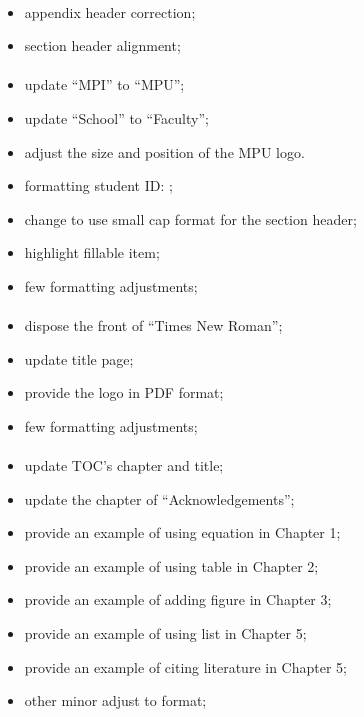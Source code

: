 \paragraph{}
	\begin{itemize}[noitemsep]
		\item appendix header correction;
		\item section header alignment;
	\end{itemize}

\paragraph{}
	\begin{itemize}[noitemsep]
		\item update ``MPI'' to ``MPU'';
		\item update ``School'' to ``Faculty'';
		\item adjust the size and position of the MPU logo.
		\item formatting student ID: ;
		\item change to use small cap format for the section header;
		\item highlight fillable item;
		\item few formatting adjustments;
	\end{itemize}

\paragraph{}
	\begin{itemize}[noitemsep]
		\item dispose the front of ``Times New Roman'';
		\item update title page;
		\item provide the logo in PDF format;
		\item few formatting adjustments;
	\end{itemize}

\paragraph{}
	\begin{itemize}[noitemsep]
		\item update TOC's chapter and title;
		\item update the chapter of ``Acknowledgements'';
		\item provide an example of using equation in Chapter 1;
		\item provide an example of using table in Chapter 2;
		\item provide an example of adding figure in Chapter 3;
		\item provide an example of using list in Chapter 5;
		\item provide an example of citing literature in Chapter 5;
		\item other minor adjust to format;
	\end{itemize}

